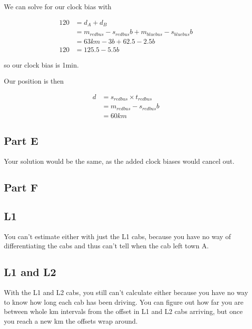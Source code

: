 \documentclass[]{article}
\begin{document}
We can solve for our clock bias with

\begin{align*}
	120 &= d_A + d_B \\
	&= m_{red bus} - s_{red bus}b + m_{blue bus} - s_{blue bus}b \\
	&= 63km - 3b + 62.5 - 2.5b \\
	120 &= 125.5 - 5.5b
\end{align*}

so our clock bias is 1min.

Our position is then 

\begin{align*}
	d &= s_{red bus} \times t_{red bus} \\
	&= m_{red bus} - s_{red bus}b \\
	&= 60km
\end{align*}

\subsection{Part E}

Your solution would be the same, as the added clock biases would cancel out.

\subsection{Part F}

\subsection{L1}

You can't estimate either with just the L1 cabs, because you have no way of differentiating the cabs and thus can't tell when the cab left town A.

\subsection{L1 and L2}

With the L1 and L2 cabs, you still can't calculate either because you have no way to know how long each cab has been driving.
You can figure out how far you are between whole km intervals from the offset in L1 and L2 cabs arriving, but once you reach a new km the offsets wrap around.
\end{document}
